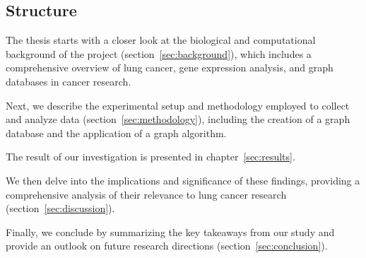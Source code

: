 \subsection{Structure}  \label{subsec:structure}
The thesis starts with a closer look at the biological and computational background of the project (section~\ref{sec:background}),
which includes a comprehensive overview of lung cancer, gene expression analysis, and graph databases in cancer research.

Next, we describe the experimental setup and methodology employed to collect and analyze data (section~\ref{sec:methodology}),
including the creation of a graph database and the application of a graph algorithm.

The result of our investigation is presented in chapter~\ref{sec:results}.

We then delve into the implications and significance of these findings,
providing a comprehensive analysis of their relevance to lung cancer research (section~\ref{sec:discussion}).

Finally, we conclude by summarizing the key takeaways from our study and provide an outlook
on future research directions (section~\ref{sec:conclusion}).

